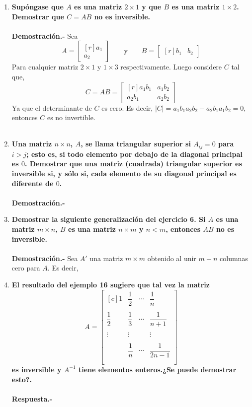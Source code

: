 \begin{enumerate}
    \item \textbf{\boldmath Supóngase que $A$ es una matriz $2\times 1$ y que $B$ es una matriz $1\times 2$. Demostrar que $C=AB$ no es inversible.\\\\
	Demostración.-}\; Sea $$A=\begin{bmatrix*}[r]
	    a_1\\
	    a_2
	\end{bmatrix*} \qquad \mbox{y} \qquad B=\begin{bmatrix*}[r]
	b_1 & b_2
    \end{bmatrix*}$$
    Para cualquier matriz $2\times 1$ y $1\times 3$ respectivamente. Luego considere $C$ tal que,
    $$C=AB=\begin{bmatrix*}[r]
	a_1b_1 & a_1b_2\\
	a_2b_1 & a_2b_2
    \end{bmatrix*}$$
    Ya que el determinante de $C$ es cero. Es decir, $|C|=a_1b_1a_2b_2-a_2b_1a_1b_2=0$, entonces $C$ es no invertible.\\\\
    

    \item \textbf{\boldmath Una matriz $n\times n$, $A$, se llama triangular superior si $A_{ij}=0$ para $i>j$; esto es, si todo elemento por debajo de la diagonal principal es $0$. Demostrar que una matriz (cuadrada) triangular superior es inversible si, y sólo si, cada elemento de su diagonal principal es diferente de $0$.\\\\
	Demostración.-}\;

    \item \textbf{\boldmath Demostrar la siguiente generalización del ejercicio 6. Si $A$ es una matriz $m\times n$, $B$ es una matriz $n\times m$ y $n<m$, entonces $AB$ no es inversible.\\\\
	Demostración.-}\; Sea $A'$ una matriz $m\times m$ obtenido al unir $m-n$ columnas cero para $A$. Es decir,  

    \item \textbf{\boldmath El resultado del ejemplo 16 sugiere que tal vez la matriz
	$$A=\begin{bmatrix*}[c]
	    1&\dfrac{1}{2}&\cdots&\dfrac{1}{n}\\\\
	    \dfrac{1}{2}&\dfrac{1}{3}&\cdots&\dfrac{1}{n+1}\\\\
	    \vdots&\vdots&&\vdots\\\\
		  &\dfrac{1}{n}&\cdots&\dfrac{1}{2n-1}\\\\
	\end{bmatrix*}$$
    es inversible y $A^{-1}$ tiene elementos enteros.¿Se puede demostrar esto?.\\\\
	Respuesta.-}\;


\end{enumerate}
